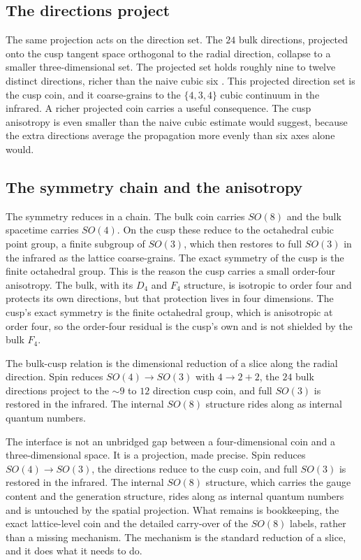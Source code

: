 \subsection{The directions project}

The same projection acts on the direction set. The $24$ bulk directions, projected onto the cusp tangent space
orthogonal to the radial direction, collapse to a smaller three-dimensional set. The projected set holds roughly
nine to twelve distinct directions, richer than the naive cubic six \cite{pollard2026vibetest}. This projected
direction set is the cusp coin, and it coarse-grains to the $\{4,3,4\}$ cubic continuum in the infrared. A
richer projected coin carries a useful consequence. The cusp anisotropy is even smaller than the naive
cubic estimate would suggest, because the extra directions average the propagation more evenly than six axes
alone would.

\subsection{The symmetry chain and the anisotropy}

The symmetry reduces in a chain. The bulk coin carries $SO(8)$ and the bulk spacetime carries $SO(4)$. On the
cusp these reduce to the octahedral cubic point group, a finite subgroup of $SO(3)$, which then restores to full
$SO(3)$ in the infrared as the lattice coarse-grains. The exact symmetry of the cusp is the finite octahedral
group. This is the reason the cusp carries a small order-four anisotropy. The bulk, with its $D_4$ and $F_4$
structure, is isotropic to order four and protects its own directions, but that protection lives in four
dimensions. The cusp's exact symmetry is the finite octahedral group, which is anisotropic at order four, so the
order-four residual is the cusp's own and is not shielded by the bulk $F_4$.

\begin{proposition}
The bulk-cusp relation is the dimensional reduction of a slice along the radial direction. Spin reduces
$SO(4) \to SO(3)$ with $4 \to 2+2$, the $24$ bulk directions project to the $\sim 9$ to $12$ direction cusp
coin, and full $SO(3)$ is restored in the infrared. The internal $SO(8)$ structure rides along as internal
quantum numbers.
\end{proposition}


The interface is not an unbridged gap between a four-dimensional coin and a three-dimensional space. It is a
projection, made precise. Spin reduces $SO(4) \to SO(3)$, the directions reduce to the cusp coin, and full
$SO(3)$ is restored in the infrared. The internal $SO(8)$ structure, which carries the gauge content and the
generation structure, rides along as internal quantum numbers and is untouched by the spatial projection. What
remains is bookkeeping, the exact lattice-level coin and the detailed carry-over of the $SO(8)$ labels, rather
than a missing mechanism. The mechanism is the standard reduction of a slice, and it does what it needs to do.
